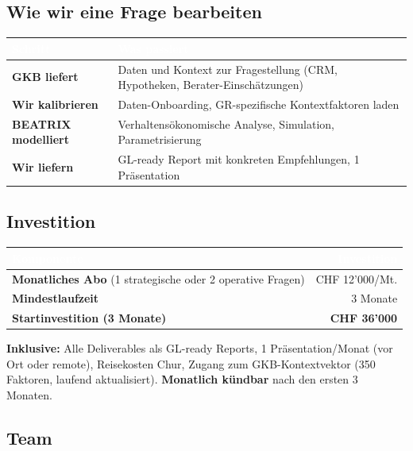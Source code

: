 \documentclass[11pt,a4paper]{article}
\newcommand{\headerrow}{\rowcolor{fadarkblue}}
\newcommand{\altrow}{\rowcolor{falightgray}}
\begin{document}
\subsection{Wie wir eine Frage bearbeiten}

\begin{center}
\begin{tabularx}{\textwidth}{>{\bfseries\color{fadarkblue}}l X}
\toprule
\headerrow \textcolor{white}{\textbf{Schritt}} & \textcolor{white}{\textbf{Was passiert}} \\
\midrule
GKB liefert & Daten und Kontext zur Fragestellung (CRM, Hypotheken, Berater-Einschätzungen) \\
\altrow Wir kalibrieren & Daten-Onboarding, GR-spezifische Kontextfaktoren laden \\
BEATRIX modelliert & Verhaltensökonomische Analyse, Simulation, Parametrisierung \\
\altrow Wir liefern & GL-ready Report mit konkreten Empfehlungen, 1 Präsentation \\
\bottomrule
\end{tabularx}
\end{center}

\subsection{Investition}

\begin{center}
\begin{tabularx}{\textwidth}{X r}
\toprule
\headerrow \textcolor{white}{\textbf{Komponente}} & \textcolor{white}{\textbf{Investition}} \\
\midrule
\textbf{Monatliches Abo} (1 strategische oder 2 operative Fragen) & CHF 12'000/Mt. \\
\altrow \textbf{Mindestlaufzeit} & 3 Monate \\
\textbf{Startinvestition (3 Monate)} & \textbf{CHF 36'000} \\
\bottomrule
\end{tabularx}
\end{center}

\vspace{0.2cm}

\textbf{Inklusive:} Alle Deliverables als GL-ready Reports, 1 Präsentation/Monat (vor Ort oder remote), Reisekosten Chur, Zugang zum GKB-Kontextvektor (350 Faktoren, laufend aktualisiert). \textbf{Monatlich kündbar} nach den ersten 3 Monaten.

\subsection{Team}
\end{document}
